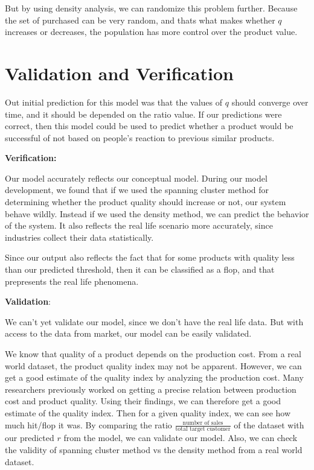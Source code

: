 \documentclass[article, 11pt, a4paper, onesize]{memoir}
\begin{document}
But by using density analysis, we can randomize this problem further. Because the set of
purchased can be very random, and thats what makes whether \(q\) increases or decreases,
the population has more control over the product value.


\section{Validation and Verification}

Out initial prediction for this model was that the values of \(q\) should converge over
time, and it should be depended on the ratio value. If our predictions were correct, then
this model could be used to predict whether a product would be successful of not based on
people's reaction to previous similar products. 

\textbf{Verification:}

Our model accurately reflects our conceptual model. During our model development, we found
that if we used the spanning cluster method for determining whether the product quality
should increase or not, our system behave wildly. Instead if we used the density method,
we can predict the behavior of the system. It also reflects the real life scenario more
accurately, since industries collect their data statistically. 

Since our output also reflects the fact that for some products with quality less than our
predicted threshold, then it can be classified as a flop, and that prepresents the real
life phenomena.

\textbf{Validation}:

We can't yet validate our model, since we don't have the real life data. But with access
to the data from market, our model can be easily validated.

We know that quality of a product depends on the production 
cost. From a real world dataset, the product quality index 
may not be apparent. However, we can get a good estimate of 
the quality index by analyzing the production cost. Many 
researchers previously worked on getting a precise relation 
between production cost and product quality. Using their 
findings, we can therefore get a good estimate of the quality 
index. Then for a given quality index, we can see how much hit/flop it was. 
By comparing the ratio $\frac{\text{number of sales}}{\text{total target customer}}$ 
of the dataset with our predicted $r$ from the model, we can 
validate our model. Also, we can check the validity of 
spanning cluster method vs the density method from a real world dataset. 
\end{document}
